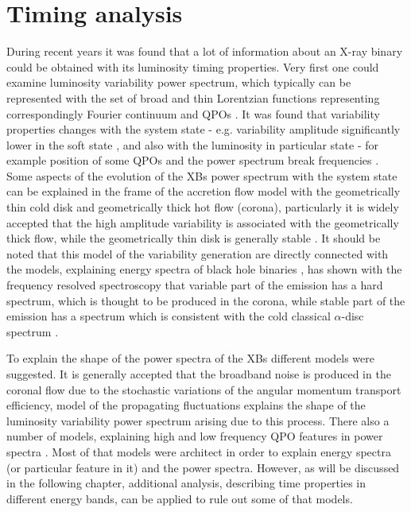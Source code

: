 \section{Timing analysis} 

During recent years it was found that a lot of information about an X-ray binary could be obtained with its luminosity timing properties.
Very first one could examine luminosity variability power spectrum, which typically can be represented with the set of broad and thin Lorentzian functions representing correspondingly Fourier continuum and QPOs \citep[see, e.g.][]{1972ApJ...174L..35T, 1990A&A...227L..33B}.
It was found that variability properties changes with the system state - e.g. variability amplitude significantly lower in the soft state \citep{},  and also with the luminosity in particular state - for example position of some QPOs and the power spectrum break frequencies \cite{1990A&A...227L..33B}. 
Some aspects of the evolution of the XBs power spectrum with the system state can be explained in the frame of the accretion flow model with the geometrically thin cold disk and geometrically thick hot flow (corona), particularly it is widely accepted that the high amplitude variability is associated with the geometrically thick flow, while the geometrically thin disk is generally stable \citep{churazov}. 
It should be noted that this model of the variability generation are directly connected with the models, explaining energy spectra of black hole binaries \citep[see, e.g.,][]{1975ApJ...199L.153E, 1976ApJ...204..187S, 1995ApJ...452..710N}, \citet{churazov} has shown with the frequency resolved spectroscopy that variable part of the emission has a hard spectrum, which is thought to be produced in the corona, while stable part of the emission has a spectrum which is consistent with the cold classical $\alpha$-disc spectrum \citep{ss73}.

To explain the shape of the power spectra of the XBs different models were suggested. 
It is generally accepted that the broadband noise is produced in the coronal flow due to the stochastic variations of the angular momentum transport efficiency, \citep{lyubarskii97} model of the propagating fluctuations explains the shape of the luminosity variability power spectrum arising due to this process. 
There also a number of models, explaining high and low frequency QPO features in power spectra \citep[][]{ingram09, cite here something please}. 
Most of that models were architect in order to explain energy spectra (or particular feature in it) and the power spectra. 
However, as will be discussed in the following chapter, additional analysis, describing time properties in different energy bands, can be applied to rule out some of that models.

